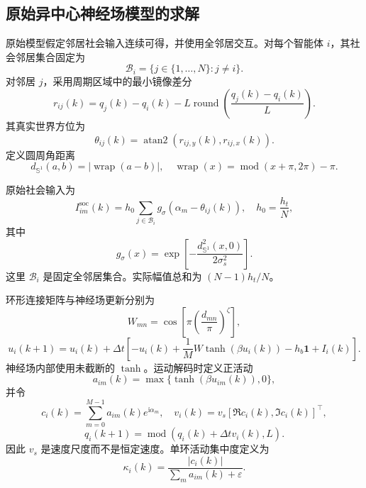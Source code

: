 \documentclass[UTF8,fontset=windows,11pt]{ctexart}
\begin{document}
\subsection{原始异中心神经场模型的求解}

原始模型假定邻居社会输入连续可得，并使用全邻居交互。对每个智能体 $i$，其社会邻居集合固定为
\begin{equation}
 \mathcal B_i=\{j\in\{1,\ldots,N\}:j\ne i\}.
\end{equation}
对邻居 $j$，采用周期区域中的最小镜像差分
\begin{equation}
 r_{ij}(k)=q_j(k)-q_i(k)-L\operatorname{round}\left(\frac{q_j(k)-q_i(k)}{L}\right).
\end{equation}
其真实世界方位为
\begin{equation}
 \theta_{ij}(k)=\operatorname{atan2}(r_{ij,y}(k),r_{ij,x}(k)).
\end{equation}
定义圆周角距离
\begin{equation}
 d_{\mathbb S^1}(a,b)=\left|\operatorname{wrap}(a-b)\right|,
\quad \operatorname{wrap}(x)=\operatorname{mod}(x+\pi,2\pi)-\pi.
\end{equation}

原始社会输入为
\begin{equation}
 I^{\mathrm{soc}}_{im}(k)=h_0\sum_{j\in\mathcal B_i}
 g_\sigma\left(\alpha_m-\theta_{ij}(k)\right),
 \quad h_0=\frac{h_t}{N},
\end{equation}
其中
\begin{equation}
 g_\sigma(x)=\exp\left[-\frac{d_{\mathbb S^1}^2(x,0)}{2\sigma_s^2}\right].
\end{equation}
这里 $\mathcal B_i$ 是固定全邻居集合。实际幅值总和为 $(N-1)h_t/N$。

环形连接矩阵与神经场更新分别为
\begin{equation}
 W_{mn}=\cos\left[\pi\left(\frac{d_{mn}}{\pi}\right)^\zeta\right],
\end{equation}
\begin{equation}
 u_i(k+1)=u_i(k)+\Delta t\left[-u_i(k)+\frac{1}{M}W\tanh(\beta u_i(k))-h_b\bm 1+I_i(k)\right].
\end{equation}
神经场内部使用未截断的 $\tanh$。运动解码时定义正活动
\begin{equation}
 a_{im}(k)=\max\{\tanh(\beta u_{im}(k)),0\},
\end{equation}
并令
\begin{equation}
 c_i(k)=\sum_{m=0}^{M-1}a_{im}(k)e^{\mathrm i\alpha_m},
\quad
 v_i(k)=v_s[\Re c_i(k),\Im c_i(k)]^\top,
\end{equation}
\begin{equation}
 q_i(k+1)=\operatorname{mod}(q_i(k)+\Delta t v_i(k),L).
\end{equation}
因此 $v_s$ 是速度尺度而不是恒定速度。单环活动集中度定义为
\begin{equation}
 \kappa_i(k)=\frac{|c_i(k)|}{\sum_m a_{im}(k)+\varepsilon}.
\end{equation}
\end{document}
